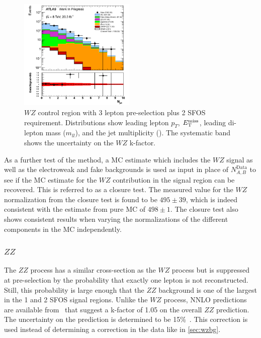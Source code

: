 \begin{figure}[htp]
\includegraphics[width=0.495\textwidth]{figures/WZ_CR/NJets_histratio.png}
\caption{$WZ$ control region with 3 lepton pre-selection plus 2 SFOS requirement. 
Distributions show leading lepton $p_{T}$, $E_{\mathrm{T}}^{\mathrm{miss}}$, leading di-lepton 
mass ($m_{ll}$), and the jet multiplicity (\njet). 
The systematic band shows the uncertainty on the $WZ$ k-factor.}
\label{fig:WZ_2SFOS_CR}
\end{figure}  

As a further test of the method, a MC estimate which includes the $WZ$ signal as
well as the electroweak and fake backgrounds is used as input in place 
of $N^{\textrm{Data}}_{A,B}$ to see if the MC estimate for the $WZ$
contribution in the signal region can be recovered. This is referred to as
a closure test.  The measured value for the $WZ$ normalization from the 
closure test is found to be  $495\pm39$, which is indeed consistent with the
estimate from pure MC of $498\pm1$. The closure test also shows consistent
results when varying the normalizations of the different components 
in the MC independently.




\subsubsection{$ZZ$}
\label{sec:zzbg}

The $ZZ$ process has a similar cross-section as 
the $WZ$ process but is 
suppressed at pre-selection 
by the probability that exactly one lepton is not reconstructed. 
Still, this probability is large enough that the $ZZ$ background is one of the 
largest in the 1 and 2 SFOS signal regions.  
Unlike the $WZ$ process, NNLO predictions are available 
from~\cite{Cascioli:2014yka,Baglio:2013toa,Bierweiler:2013dja}
that suggest a k-factor of 1.05 on the overall $ZZ$ prediction.
The uncertainty on the prediction is determined to be 
15\%~\cite{Cascioli:2014yka,Baglio:2013toa,Bierweiler:2013dja}.
This correction is used instead of determining a correction in the data
like in \sec\ref{sec:wzbg}.

